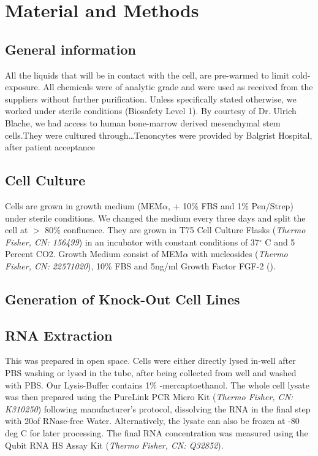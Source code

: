 \renewcommand{\package}{\emph}
\newcommand{\product}{\textit}

\chapter{Material and Methods}

\section{General information}
All the liquids that will be in contact with the cell, are pre-warmed to limit cold-exposure. All chemicals were of analytic grade and were used as received from the suppliers without further purification.  Unless specifically stated otherwise, we worked under sterile conditions (Biosafety Level 1). By courtesy of Dr. Ulrich Blache, we had access to human bone-marrow derived mesenchymal stem cells.They were cultured through\ldots Tenoncytes were provided by Balgrist Hospital, after patient acceptance

\section{Cell Culture}

Cells are grown in growth medium  (MEM$\alpha$, + 10\% FBS and 1\% Pen/Strep) under sterile conditions. We changed the medium every three days and split the cell at $>$ 80\% confluence. 
They are grown in T75 Cell Culture Flasks (\product{Thermo Fisher, CN: 156499}) in an incubator with constant conditions of 37$^{\circ}$ C and 5 Percent CO2. Growth Medium consist of MEM$\alpha$ with nucleosides (\product{Thermo Fisher, CN: 22571020}), 10\% FBS and 5ng/ml Growth Factor FGF-2 ().

\section{Generation of Knock-Out Cell Lines}

\section{RNA Extraction}
This was prepared in open space. Cells were either directly lysed in-well after PBS washing or lysed in the tube, after being collected from well and washed with PBS. Our Lysis-Buffer contains 1\% \textbeta-mercaptoethanol. The whole cell lysate was then prepared using the PureLink PCR Micro Kit (\product{Thermo Fisher, CN: K310250}) following manufacturer's protocol, dissolving the RNA in the final step with 20\mul of RNase-free Water. Alternatively, the lysate can also be frozen at -80 deg C for later processing. The final RNA concentration was measured using the Qubit RNA HS Assay Kit (\product{Thermo Fisher, CN: Q32852}). 

